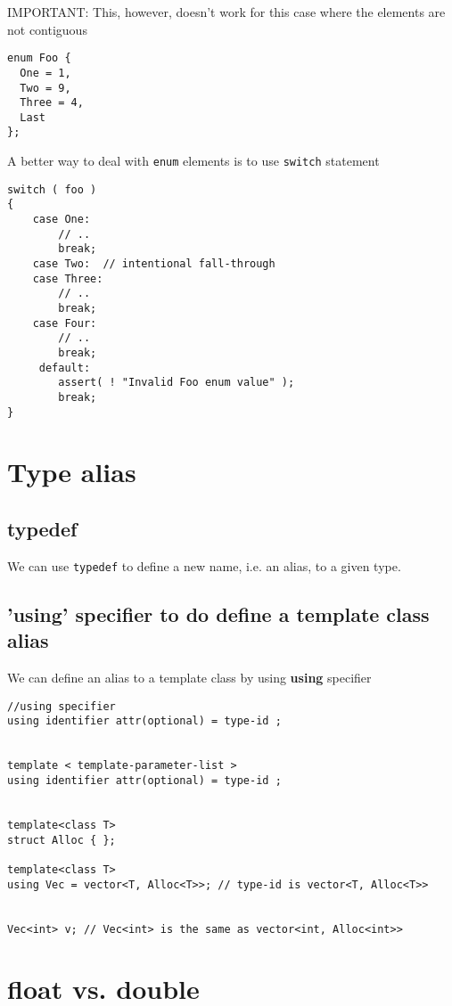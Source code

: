 IMPORTANT: This, however, doesn't work for this case where the elements are not
contiguous
\begin{verbatim}
enum Foo {
  One = 1,
  Two = 9,
  Three = 4,
  Last
};
\end{verbatim}

A better way to deal with \verb!enum! elements is to use \verb!switch! statement
\begin{verbatim}
switch ( foo )
{
    case One:
        // ..
        break;
    case Two:  // intentional fall-through
    case Three:
        // ..
        break;
    case Four:
        // ..
        break;
     default:
        assert( ! "Invalid Foo enum value" );
        break;
}
\end{verbatim}

\section{Type alias}
\label{sec:type-alias}

\subsection{typedef}
\label{sec:typedef-C}

We can use \verb!typedef! to define a new name, i.e. an alias, to a given type.

\subsection{'using' specifier to do define a template class alias}


We can define an alias to a template class by using {\bf using} specifier
\begin{verbatim}
//using specifier
using identifier attr(optional) = type-id ;	


template < template-parameter-list >
using identifier attr(optional) = type-id ;


template<class T>
struct Alloc { };

template<class T>
using Vec = vector<T, Alloc<T>>; // type-id is vector<T, Alloc<T>>


Vec<int> v; // Vec<int> is the same as vector<int, Alloc<int>>
\end{verbatim}

\section{float vs. double}
\label{sec:float}
\label{sec:double}

